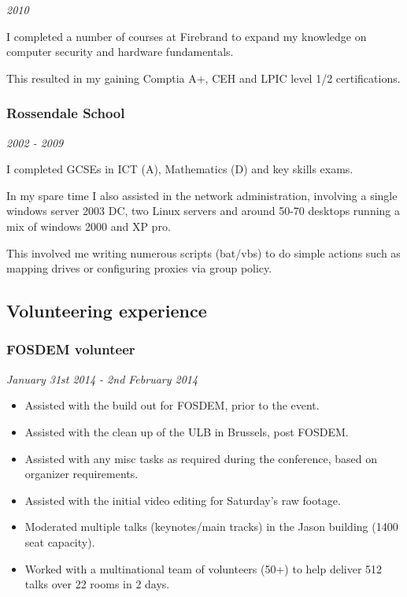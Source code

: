 \emph{2010}

I completed a number of courses at Firebrand to expand my knowledge on
computer security and hardware fundamentals.

This resulted in my gaining Comptia A+, CEH and LPIC level 1/2
certifications.

\subsubsection{Rossendale School}\label{rossendale-school}

\emph{2002 - 2009}

I completed GCSEs in ICT (A), Mathematics (D) and key skills exams.

In my spare time I also assisted in the network administration,
involving a single windows server 2003 DC, two Linux servers and around
50-70 desktops running a mix of windows 2000 and XP pro.

This involved me writing numerous scripts (bat/vbs) to do simple actions
such as mapping drives or configuring proxies via group policy.

\subsection{Volunteering experience}\label{volunteering-experience}

\subsubsection{FOSDEM volunteer}\label{fosdem-volunteer}

\emph{January 31st 2014 - 2nd February 2014}

\begin{itemize}
\itemsep1pt\parskip0pt
\item
  Assisted with the build out for FOSDEM, prior to the event.
\item
  Assisted with the clean up of the ULB in Brussels, post FOSDEM.
\item
  Assisted with any misc tasks as required during the conference, based
  on organizer requirements.
\item
  Assisted with the initial video editing for Saturday's raw footage.
\item
  Moderated multiple talks (keynotes/main tracks) in the Jason building
  (1400 seat capacity).
\item
  Worked with a multinational team of volunteers (50+) to help deliver
  512 talks over 22 rooms in 2 days.
\end{itemize}

